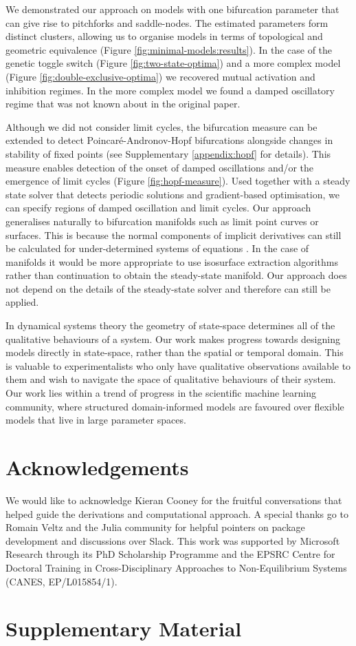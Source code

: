 \documentclass{article}
\begin{document}
We demonstrated our approach on models with one bifurcation parameter that can give rise to pitchforks and saddle-nodes. The estimated parameters form distinct clusters, allowing us to organise models in terms of topological and geometric equivalence (Figure \ref{fig:minimal-models:results}). In the case of the genetic toggle switch (Figure \ref{fig:two-state-optima}) and a more complex model \cite{Grant2020InterpretationCircuit} (Figure \ref{fig:double-exclusive-optima}) we recovered mutual activation and inhibition regimes. In the more complex model we found a damped oscillatory regime that was not known about in the original paper.

Although we did not consider limit cycles, the bifurcation measure can be extended to detect Poincar\'e-Andronov-Hopf bifurcations alongside changes in stability of fixed points (see Supplementary \ref{appendix:hopf} for details). This measure enables detection of the onset of damped oscillations and/or the emergence of limit cycles (Figure \ref{fig:hopf-measure}). Used together with a steady state solver that detects periodic solutions and gradient-based optimisation, we can specify regions of damped oscillation and limit cycles. Our approach generalises naturally to bifurcation manifolds such as limit point curves or surfaces. This is because the normal components of implicit derivatives can still be calculated for under-determined systems of equations \cite{Jos2011OnSurface,Tao2016Near-IsometricTracking,Fujisawa2013CalculationInvariance}. In the case of manifolds it would be more appropriate to use isosurface extraction algorithms rather than continuation to obtain the steady-state manifold. Our approach does not depend on the details of the steady-state solver and therefore can still be applied.

In dynamical systems theory the geometry of state-space determines all of the qualitative behaviours of a system. Our work makes progress towards designing models directly in state-space, rather than the spatial or temporal domain. This is valuable to experimentalists who only have qualitative observations available to them and wish to navigate the space of qualitative behaviours of their system. Our work lies within a trend of progress in the scientific machine learning community, where structured domain-informed models are favoured over flexible models that live in large parameter spaces.

\section{Acknowledgements}
We would like to acknowledge Kieran Cooney for the fruitful conversations that helped guide the derivations and computational approach. A special thanks go to Romain Veltz and the Julia community for helpful pointers on package development and discussions over Slack. This work was supported by Microsoft Research through its PhD Scholarship Programme and the EPSRC Centre for Doctoral Training in Cross-Disciplinary Approaches to Non-Equilibrium Systems (CANES, EP/L015854/1).
\clearpage



\clearpage{}\setcounter{page}{1}
\section*{Supplementary Material}
\appendix
{}


\end{document}
